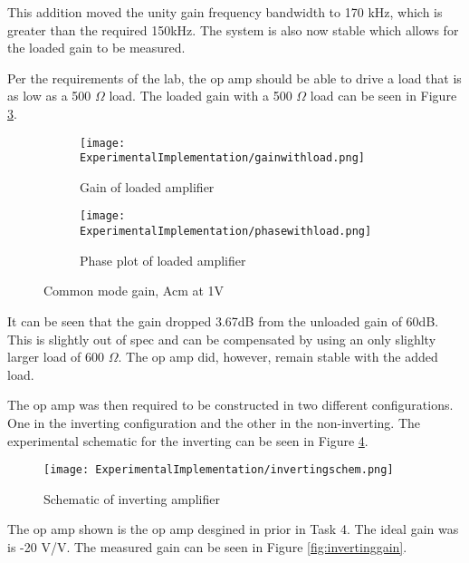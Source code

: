 	This addition moved the unity gain frequency bandwidth to 170 kHz, which is greater than the required 150kHz. The system is also now stable which allows for the loaded gain to be measured.
		
		
		 Per the requirements of the lab, the op amp should be able to drive a load that is as low as a 500 $\Omega$ load. The loaded gain with a 500 $\Omega$ load can be seen in Figure \ref{fig:gainwithload}.
				
		
	
	
	\begin{figure}[H]
		\centering
		\begin{subfigure}[b]{0.45\textwidth}
			\centering
			\texttt{[image: ExperimentalImplementation/gainwithload.png]}
		\caption{Gain of loaded amplifier}
		\label{fig:tload}
		\end{subfigure}
		\hfill
		\begin{subfigure}[b]{0.45\textwidth}
			\centering
			\texttt{[image: ExperimentalImplementation/phasewithload.png]}
		\caption{Phase plot of loaded amplifier}
		\label{fig:phasewithload}
		\end{subfigure}
		\caption{Common mode gain, Acm at 1V}
		\label{fig:gainwithload}
	\end{figure} 
	
It can be seen that the gain dropped 3.67dB from the unloaded gain of 60dB. This is slightly out of spec and can be compensated by using an only slighlty larger load of 600 $\Omega$. The op amp did, however, remain stable with the added load.
	
	
The op amp was then required to be constructed in two different configurations. One in the inverting configuration and the other in the non-inverting. The experimental schematic for the inverting can be seen in Figure \ref{fig:invertingschem}.

		\begin{figure}[H]
	\begin{center}
		\texttt{[image: ExperimentalImplementation/invertingschem.png]}
		\caption{Schematic of inverting amplifier}
		\label{fig:invertingschem}
	\end{center}
\end{figure}

The op amp shown is the op amp desgined in prior in Task 4. The ideal gain was is -20 V/V. The measured gain can be seen in Figure \ref{fig:invertinggain}.
	
	
	
